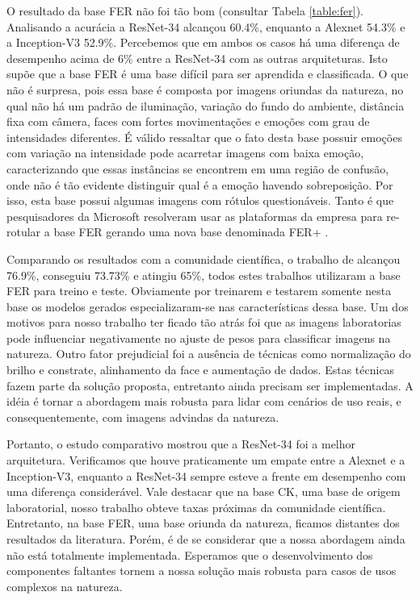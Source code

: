 O resultado da base FER não foi tão bom (consultar Tabela \ref{table:fer}). Analisando a acurácia a ResNet-34 alcançou 60.4\%, enquanto a Alexnet 54.3\% e a Inception-V3 52.9\%. Percebemos que em ambos os casos há uma diferença de desempenho acima de 6\% entre a ResNet-34 com as outras arquiteturas. Isto supõe que a base FER é uma base difícil para ser aprendida e classificada. O que não é surpresa, pois essa base é composta por imagens oriundas da natureza, no qual não há um padrão de iluminação, variação do fundo do ambiente, distância fixa com câmera, faces com fortes movimentações e emoções com grau de intensidades diferentes. É válido ressaltar que o fato desta base possuir emoções com variação na intensidade pode acarretar imagens com baixa emoção, caracterizando que essas instâncias se encontrem em uma região de confusão, onde não é tão evidente distinguir qual é a emoção havendo sobreposição. Por isso, esta base possui algumas imagens com rótulos questionáveis. Tanto é que pesquisadores da Microsoft resolveram usar as plataformas da empresa para re-rotular a base FER gerando uma nova base denominada FER+ \citep{barsoum2016training}.      

Comparando os resultados com a comunidade científica, o trabalho de \cite{art7} alcançou 76.9\%, \cite{kim2016fusing} conseguiu 73.73\% e \cite{art5} atingiu 65\%, todos estes trabalhos utilizaram a base FER para treino e teste. Obviamente por treinarem e testarem somente nesta base os modelos gerados especializaram-se nas características dessa base. Um dos motivos para nosso trabalho ter ficado tão atrás foi que as imagens laboratorias pode influenciar negativamente no ajuste de pesos para classificar imagens na natureza. Outro fator prejudicial foi a ausência de técnicas como normalização do brilho e constrate, alinhamento da face e aumentação de dados. Estas técnicas fazem parte da solução proposta, entretanto ainda precisam ser implementadas. A idéia é tornar a abordagem mais robusta para lidar com cenários de uso reais, e consequentemente, com imagens advindas da natureza.    

Portanto, o estudo comparativo mostrou que a ResNet-34 foi a melhor arquitetura. Verificamos que houve praticamente um empate entre a Alexnet e a Inception-V3, enquanto a ResNet-34 sempre esteve a frente em desempenho com uma diferença considerável. Vale destacar que na base CK, uma base de origem laboratorial, nosso trabalho obteve taxas próximas da comunidade científica. Entretanto, na base FER, uma base oriunda da natureza, ficamos distantes dos resultados da literatura. Porém, é de se considerar que a nossa abordagem ainda não está totalmente implementada. Esperamos que o desenvolvimento dos componentes faltantes tornem a nossa solução mais robusta para casos de usos complexos na natureza. 

